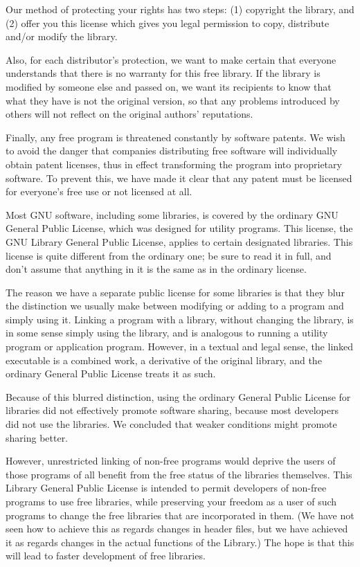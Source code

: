 \documentclass[]{article}
\begin{document}
Our method of protecting your rights has two steps: (1) copyright the
library, and (2) offer you this license which gives you legal permission
to copy, distribute and/or modify the library.

Also, for each distributor's protection, we want to make certain that
everyone understands that there is no warranty for this free library. If
the library is modified by someone else and passed on, we want its
recipients to know that what they have is not the original version, so
that any problems introduced by others will not reflect on the original
authors' reputations.

Finally, any free program is threatened constantly by software patents.
We wish to avoid the danger that companies distributing free software
will individually obtain patent licenses, thus in effect transforming
the program into proprietary software. To prevent this, we have made it
clear that any patent must be licensed for everyone's free use or not
licensed at all.

Most GNU software, including some libraries, is covered by the ordinary
GNU General Public License, which was designed for utility programs.
This license, the GNU Library General Public License, applies to certain
designated libraries. This license is quite different from the ordinary
one; be sure to read it in full, and don't assume that anything in it is
the same as in the ordinary license.

The reason we have a separate public license for some libraries is that
they blur the distinction we usually make between modifying or adding to
a program and simply using it. Linking a program with a library, without
changing the library, is in some sense simply using the library, and is
analogous to running a utility program or application program. However,
in a textual and legal sense, the linked executable is a combined work,
a derivative of the original library, and the ordinary General Public
License treats it as such.

Because of this blurred distinction, using the ordinary General Public
License for libraries did not effectively promote software sharing,
because most developers did not use the libraries. We concluded that
weaker conditions might promote sharing better.

However, unrestricted linking of non-free programs would deprive the
users of those programs of all benefit from the free status of the
libraries themselves. This Library General Public License is intended to
permit developers of non-free programs to use free libraries, while
preserving your freedom as a user of such programs to change the free
libraries that are incorporated in them. (We have not seen how to
achieve this as regards changes in header files, but we have achieved it
as regards changes in the actual functions of the Library.) The hope is
that this will lead to faster development of free libraries.
\end{document}
